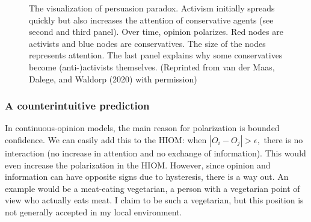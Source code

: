 \documentclass[
  a4paper,
  DIV=11,
  numbers=noendperiod,
  oneside]{scrreprt}
\begin{document}
\begin{figure}


\caption{\label{fig-ch7-img11-old-99}The visualization of persuasion
paradox. Activism initially spreads quickly but also increases the
attention of conservative agents (see second and third panel). Over
time, opinion polarizes. Red nodes are activists and blue nodes are
conservatives. The size of the nodes represents attention. The last
panel explains why some conservatives become (anti-)activists
themselves. (Reprinted from van der Maas, Dalege, and Waldorp (2020)
with permission)}

\end{figure}%

\subsubsection{A counterintuitive
prediction}\label{sec-A-counterintuitive-prediction}

In continuous-opinion models, the main reason for polarization is
bounded confidence. We can easily add this to the HIOM: when
\(\left| O_{i} - O_{j} \right| > \epsilon,\) there is no interaction (no
increase in attention and no exchange of information). This would even
increase the polarization in the HIOM. However, since opinion and
information can have opposite signs due to hysteresis, there is a way
out. An example would be a meat-eating vegetarian, a person with a
vegetarian point of view who actually eats meat. I claim to be such a
vegetarian, but this position is not generally accepted in my local
environment.
\end{document}
